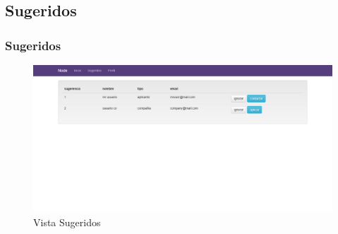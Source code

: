 \subsection{Sugeridos}
\frame
{
  \frametitle{Sugeridos}
  
	\begin{figure}[h]
	\begin{center}
	 	\includegraphics[scale=0.20]{./resources/vistas/sugeridos.png} 
		\caption{Vista Sugeridos}
	\end{center}
	\end{figure}
}